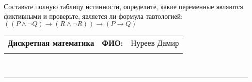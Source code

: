 \documentclass[10pt]{exam}
\newcommand{\class}{Дискретная математика}
\newcommand{\examdate}{}
\begin{document}
\begin{questions}
\begin{enumerate} [a)]
\end{enumerate}\question Составьте полную таблицу истинности, определите, какие переменные являются фиктивными и проверьте, является ли формула тавтологией:
$(( P \land \neg Q) \rightarrow (R \land \neg R)) \rightarrow (P \rightarrow Q)$

\end{questions}
\newpage
\begin{flushright}
\begin{tabular}{p{2.8in} r l}
\textbf{\class} & \textbf{ФИО:} &Нуреев Дамир
\\

\textbf{\examdate} &&\\
\end{tabular}\\
\end{flushright}
\rule[1ex]{\textwidth}{.1pt}
\end{document}
